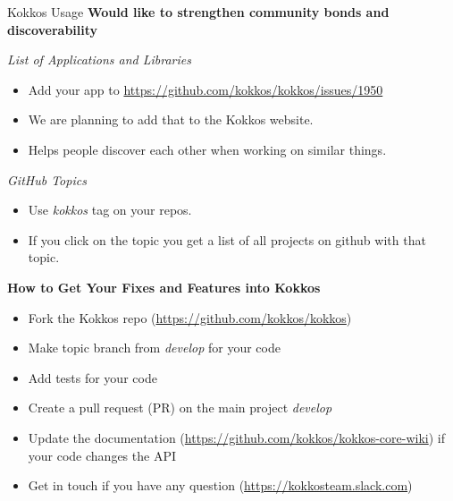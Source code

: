 \begin{frame}[fragile]{Kokkos Usage}
  \textbf{Would like to strengthen community bonds and discoverability}

  \vspace{10pt}
  \textit{List of Applications and Libraries}
  \begin{itemize}
    \item Add your app to \url{https://github.com/kokkos/kokkos/issues/1950}
    \item We are planning to add that to the Kokkos website.
    \item Helps people discover each other when working on similar things.
  \end{itemize}

  \vspace{10pt}
  \textit{GitHub Topics}
  \begin{itemize}
    \item Use \textit{kokkos} tag on your repos.
    \item If you click on the topic you get a list of all projects on github with that topic.
  \end{itemize}
\end{frame}










\begin{frame}[fragile]

  \vspace{10pt}

  \textbf{How to Get Your Fixes and Features into Kokkos}
  \newline
  \begin{itemize}
    \item Fork the Kokkos repo (\url{https://github.com/kokkos/kokkos})
    \item Make topic branch from \textit{develop} for your code
    \item Add tests for your code
    \item Create a pull request (PR) on the main project \textit{develop}
    \item Update the documentation (\url{https://github.com/kokkos/kokkos-core-wiki}) if your code changes the API
    \item Get in touch if you have any question (\url{https://kokkosteam.slack.com})
  \end{itemize}

\end{frame}



